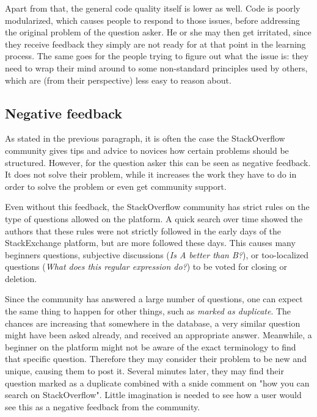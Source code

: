 \documentclass[conference]{IEEEtran}
\begin{document}
Apart from that, the general code quality itself is lower as well. Code is poorly modularized, which causes people to respond to those issues, before addressing the original problem of the question asker. He or she may then get irritated, since they receive feedback they simply are not ready for at that point in the learning process. The same goes for the people trying to figure out what the issue is: they need to wrap their mind around to some non-standard principles used by others, which are (from their perspective) less easy to reason about.

\subsection{Negative feedback}

As stated in the previous paragraph, it is often the case the StackOverflow community gives tips and advice to novices how certain problems should be structured. However, for the question asker this can be seen as negative feedback. It does not solve their problem, while it increases the work they have to do in order to solve the problem or even get community support.

Even without this feedback, the StackOverflow community has strict rules on the type of questions allowed on the platform. A quick search over time showed the authors that these rules were not strictly followed in the early days of the StackExchange platform, but are more followed these days. This causes many beginners questions, subjective discussions (\textit{Is A better than B?}), or too-localized questions (\textit{What does this regular expression do?}) to be voted for closing or deletion.

Since the community has answered a large number of questions, one can expect the same thing to happen for other things, such as \textit{marked as duplicate}. The chances are increasing that somewhere in the database, a very similar question might have been asked already, and received an appropriate answer. Meanwhile, a beginner on the platform might not be aware of the exact terminology to find that specific question. Therefore they may consider their problem to be new and unique, causing them to post it. Several minutes later, they may find their question marked as a duplicate combined with a snide comment on "how you can search on StackOverflow". Little imagination is needed to see how a user would see this as a negative feedback from the community.
\end{document}
